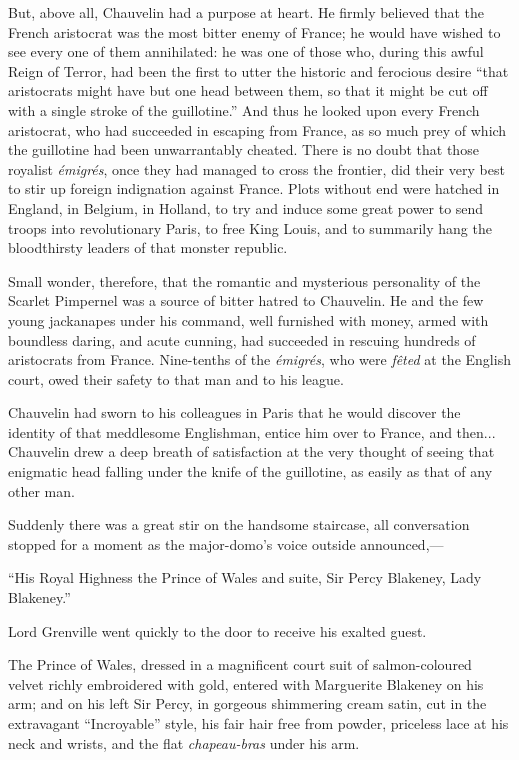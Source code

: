 \documentclass[paper=5.5in:8.5in,BCOR=7mm,twoside,DIV=calc,12pt,usegeometry,chapterprefix,endperiod,headings=big]{scrbook}
\begin{document}
But, above all, Chauvelin had a purpose at heart. He firmly believed that the French aristocrat was the most bitter enemy of France; he would have wished to see every one of them annihilated: he was one of those who, during this awful Reign of Terror, had been the first to utter the historic and ferocious desire \enquote{that aristocrats might have but one head between them, so that it might be cut off with a single stroke of the guillotine.} And thus he looked upon every French aristocrat, who had succeeded in escaping from France, as so much prey of which the guillotine had been unwarrantably cheated. There is no doubt that those royalist \textit{émigrés}, once they had managed to cross the frontier, did their very best to stir up foreign indignation against France. Plots without end were hatched in England, in Belgium, in Holland, to try and induce some great power to send troops into revolutionary Paris, to free King Louis, and to summarily hang the bloodthirsty leaders of that monster republic.

Small wonder, therefore, that the romantic and mysterious personality of the Scarlet Pimpernel was a source of bitter hatred to Chauvelin. He and the few young jackanapes under his command, well furnished with money, armed with boundless daring, and acute cunning, had succeeded in rescuing hundreds of aristocrats from France. Nine-tenths of the \textit{émigrés}, who were \textit{fêted} at the English court, owed their safety to that man and to his league.

Chauvelin had sworn to his colleagues in Paris that he would discover the identity of that meddlesome Englishman, entice him over to France, and then... Chauvelin drew a deep breath of satisfaction at the very thought of seeing that enigmatic head falling under the knife of the guillotine, as easily as that of any other man.

Suddenly there was a great stir on the handsome staircase, all conversation stopped for a moment as the major-domo's voice outside announced,---

\enquote{His Royal Highness the Prince of Wales and suite, Sir Percy Blakeney, Lady Blakeney.}

Lord Grenville went quickly to the door to receive his exalted guest.

The Prince of Wales, dressed in a magnificent court suit of salmon-coloured velvet richly embroidered with gold, entered with Marguerite Blakeney on his arm; and on his left Sir Percy, in gorgeous shimmering cream satin, cut in the extravagant \enquote{Incroyable} style, his fair hair free from powder, priceless lace at his neck and wrists, and the flat \textit{chapeau-bras} under his arm.
\end{document}
